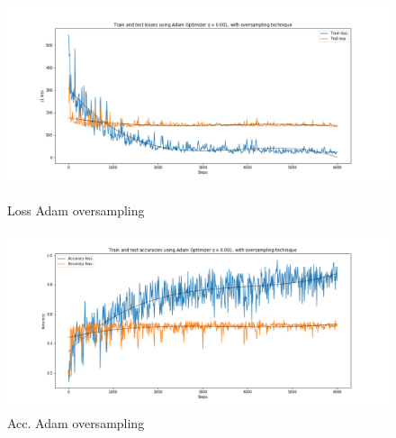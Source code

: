 \documentclass{article}
\begin{document}
 \begin{figure}[ht]
  \begin{minipage}[b]{0.5\linewidth}
    \centering
    \includegraphics[width=1.1\linewidth]{loss_adam_oversample.png} 
    \caption{Loss Adam oversampling} 
  \end{minipage}
  \begin{minipage}[b]{0.5\linewidth}
    \centering
    \includegraphics[width=1.1\linewidth]{acc_adam_oversample.png} 
    \caption{Acc. Adam oversampling}
  \end{minipage} 
\end{figure}
\end{document}
